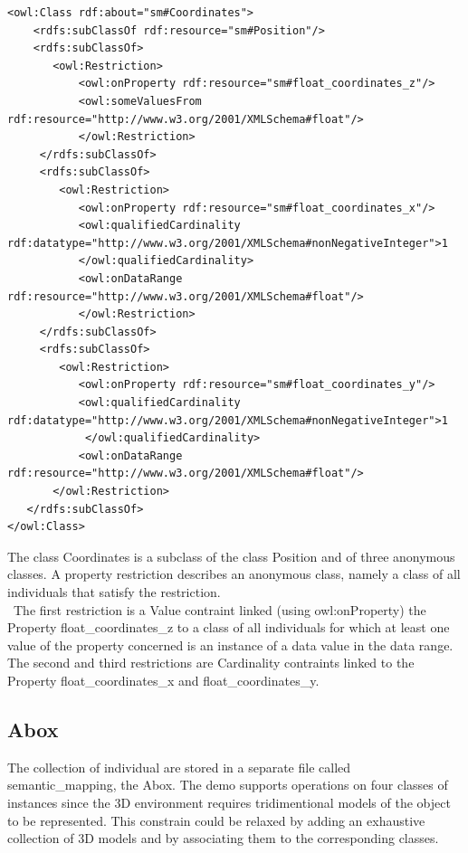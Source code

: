 \begin{lstlisting}
<owl:Class rdf:about="sm#Coordinates">
    <rdfs:subClassOf rdf:resource="sm#Position"/>
    <rdfs:subClassOf>
       <owl:Restriction>
           <owl:onProperty rdf:resource="sm#float_coordinates_z"/>
           <owl:someValuesFrom rdf:resource="http://www.w3.org/2001/XMLSchema#float"/>
           </owl:Restriction>
     </rdfs:subClassOf>
     <rdfs:subClassOf>
        <owl:Restriction>
           <owl:onProperty rdf:resource="sm#float_coordinates_x"/>
           <owl:qualifiedCardinality rdf:datatype="http://www.w3.org/2001/XMLSchema#nonNegativeInteger">1
           </owl:qualifiedCardinality>
           <owl:onDataRange rdf:resource="http://www.w3.org/2001/XMLSchema#float"/>
           </owl:Restriction>
     </rdfs:subClassOf>
     <rdfs:subClassOf>
        <owl:Restriction>
           <owl:onProperty rdf:resource="sm#float_coordinates_y"/>
           <owl:qualifiedCardinality rdf:datatype="http://www.w3.org/2001/XMLSchema#nonNegativeInteger">1
			</owl:qualifiedCardinality>
           <owl:onDataRange rdf:resource="http://www.w3.org/2001/XMLSchema#float"/>
       </owl:Restriction>
   </rdfs:subClassOf>
</owl:Class>   
\end{lstlisting}

The class Coordinates is a subclass of the class Position and of three anonymous classes. A property restriction describes an anonymous class, namely a class of all individuals that satisfy the restriction. \\\
The first restriction is a Value contraint linked (using owl:onProperty) the Property float\_coordinates\_z  to a class of all individuals for which at least one value of the property concerned is an instance of a data value in the data range.\\
The second and third restrictions are Cardinality contraints linked to the Property float\_coordinates\_x and float\_coordinates\_y.


\subsection{Abox}
The collection of individual are stored in a separate file called semantic\_mapping, the Abox. The demo supports operations on four classes of instances since the 3D environment requires tridimentional models of the object to be represented. This constrain could be relaxed by adding an exhaustive collection of 3D models and by associating them to the corresponding classes.\\

